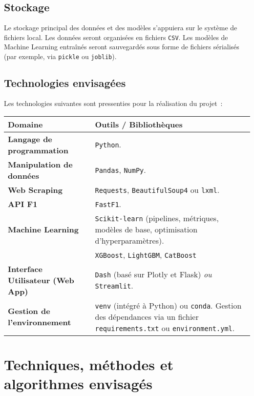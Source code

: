 \documentclass[11pt, a4paper]{article}
\newcommand{\lib}[1]{\texttt{#1}}
\newcommand{\techcat}[1]{\textbf{#1}}
\begin{document}
\subsection{Stockage}
Le stockage principal des données et des modèles s'appuiera sur le système de fichiers local. Les données seront organisées en fichiers \lib{CSV}. Les modèles de Machine Learning entraînés seront sauvegardés sous forme de fichiers sérialisés (par exemple, via \lib{pickle} ou \lib{joblib}).

\subsection{Technologies envisagées}
Les technologies suivantes sont pressenties pour la réalisation du projet~:

\medskip
\noindent
\begin{tabularx}{\textwidth}{@{} >{\RaggedRight}p{} X @{}}
\toprule
\textbf{Domaine} & \textbf{Outils / Bibliothèques} \\
\midrule
\techcat{Langage de programmation} & \lib{Python}. \\
\addlinespace
\techcat{Manipulation de données} & \lib{Pandas}, \lib{NumPy}. \\
\addlinespace
\techcat{Web Scraping} & \lib{Requests}, \lib{BeautifulSoup4} ou \lib{lxml}. \\
\addlinespace
\techcat{API F1} & \lib{FastF1}. \\
\addlinespace
\techcat{Machine Learning} & \lib{Scikit-learn} (pipelines, métriques, modèles de base, optimisation d'hyperparamètres). \\
& \lib{XGBoost}, \lib{LightGBM}, \lib{CatBoost} \\
\addlinespace
\techcat{Interface Utilisateur (Web App)} & \lib{Dash} (basé sur Plotly et Flask) \textit{ou} \lib{Streamlit}. \\
\addlinespace
\techcat{Gestion de l'environnement} & \lib{venv} (intégré à Python) ou \lib{conda}. Gestion des dépendances via un fichier \lib{requirements.txt} ou \lib{environment.yml}. \\
\bottomrule
\end{tabularx}
\medskip

\section{Techniques, méthodes et algorithmes envisagés}
\end{document}
